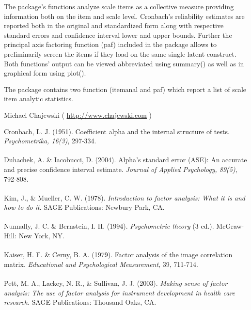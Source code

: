 \begin{Description}\relax
The package's functions analyze scale items as a collective measure 
providing information both on the item and scale level. Cronbach's reliability estimates are
reported both in the original and standardized form along with respective standard 
errors and confidence interval lower and upper bounds. Further the principal axis factoring 
function (paf) included in the package allows to preliminarily screen the items if they load
on the same single latent construct. Both functions' output can be viewed abbreviated using
summary() as well as in graphical form using plot().
\end{Description}
\begin{Details}\relax
{}

The package contains two function (itemanal and paf) which report a list of scale item analytic statistics.
\end{Details}
\begin{Author}\relax
Michael Chajewski ( \url{http://www.chajewski.com} )
\end{Author}
\begin{References}\relax
Cronbach, L. J. (1951). Coefficient alpha and the internal structure of tests. \emph{Psychometrika, 16(3)}, 297-334. \\
\\
Duhachek, A. \& Iacobucci, D. (2004). Alpha's standard error (ASE): An accurate and precise confidence interval estimate. \emph{Journal of Applied Psychology, 89(5)}, 792-808. \\
\\
Kim, J., \& Mueller, C. W. (1978). \emph{Introduction to factor analysis: What it is and how to do it}. SAGE Publications: Newbury Park, CA. \\
\\
Nunnally, J. C. \& Bernstein, I. H. (1994). \emph{Psychometric theory} (3 ed.). McGraw-Hill: New York, NY. \\
\\
Kaiser, H. F. \& Cerny, B. A. (1979). Factor analysis of the image correlation matrix. \emph{Educational and Psychological Measurement}, 39, 711-714.\\
\\
Pett, M. A., Lackey, N. R., \& Sullivan, J. J. (2003). \emph{Making sense of factor analysis: The use of factor analysis for instrument development in health care research}. SAGE Publications: Thousand Oaks, CA.
\end{References}

